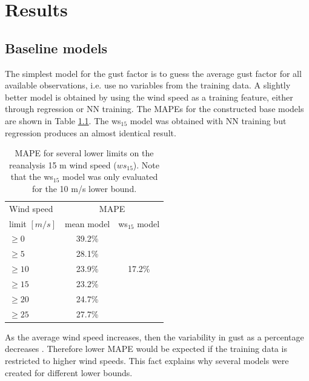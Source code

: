 \chapter{Results}
\label{Chapter4}
\section{Baseline models}
The simplest model for the gust factor is to guess the average gust factor for all available observations, i.e. use no variables from the training data. A slightly better model is obtained by using the wind speed as a training feature, either through regression or NN training. The MAPEs for the constructed base models are shown in Table \ref{table:baseline_models}. The ws$_{15}$ model was obtained with NN training but regression produces an almost identical result.

\begin{table}[h]
  \caption[MAPE for baseline models]{MAPE for several lower limits on the reanalysis 15 m wind speed ($ws_{15}$). Note that the ws$_{15}$ model was only evaluated for the 10 m/s lower bound.}
    \label{table:baseline_models}
    \centering
    \begin{tabular}{lcc}
        \toprule
        Wind speed & \multicolumn{2}{c}{MAPE}\\ 
        limit $[m/s]$ & mean model & ws$_{15}$ model\\
        \midrule
        $\geq 0$ & 39.2\%  & \\
        $\geq 5$ & 28.1\%  & \\
        $\geq 10$ & 23.9\% & 17.2\%\\
        $\geq 15$ & 23.2\% & \\
        $\geq 20$ & 24.7\% & \\
        $\geq 25$ & 27.7\% & \\
        \bottomrule
    \end{tabular}
\end{table}

As the average wind speed increases, then the variability in gust as a percentage decreases \cite{mean_gust_HA_HO}. Therefore lower MAPE would be expected if the training data is restricted to higher wind speeds. This fact explains why several models were created for different lower bounds.

